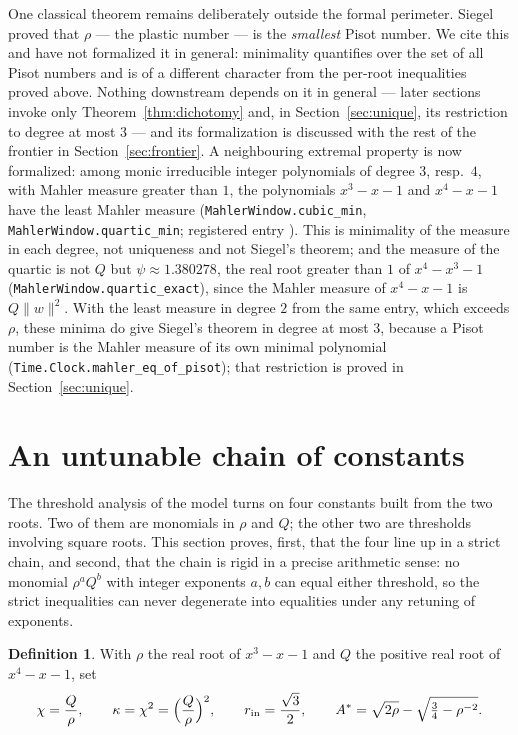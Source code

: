 \documentclass[11pt]{amsart}
\theoremstyle{plain}
\theoremstyle{definition}
\newtheorem{definition}[theorem]{Definition}
\theoremstyle{remark}
\begin{document}
One classical theorem remains deliberately outside the formal perimeter. Siegel \cite{siegel1944} proved that $\rho$ --- the plastic number \cite{aarts2001} --- is the \emph{smallest} Pisot number. We cite this and have not formalized it in general: minimality quantifies over the set of all Pisot numbers and is of a different character from the per-root inequalities proved above. Nothing downstream depends on it in general --- later sections invoke only Theorem~\ref{thm:dichotomy} and, in Section~\ref{sec:unique}, its restriction to degree at most $3$ --- and its formalization is discussed with the rest of the frontier in Section~\ref{sec:frontier}. A neighbouring extremal property is now formalized: among monic irreducible integer polynomials of degree $3$, resp.\ $4$, with Mahler measure greater than $1$, the polynomials $x^3 - x - 1$ and $x^4 - x - 1$ have the least Mahler measure (\texttt{MahlerWindow.cubic\_min}, \texttt{MahlerWindow.quartic\_min}; registered entry \cite{palomar-mahler}). This is minimality of the measure in each degree, not uniqueness and not Siegel's theorem; and the measure of the quartic is not $Q$ but $\psi \approx 1.380278$, the real root greater than $1$ of $x^4 - x^3 - 1$ (\texttt{MahlerWindow.quartic\_exact}), since the Mahler measure of $x^4 - x - 1$ is $Q \lVert w \rVert^2$. With the least measure in degree $2$ from the same entry, which exceeds $\rho$, these minima do give Siegel's theorem in degree at most $3$, because a Pisot number is the Mahler measure of its own minimal polynomial (\texttt{Time.Clock.mahler\_eq\_of\_pisot}); that restriction is proved in Section~\ref{sec:unique}.

\section{An untunable chain of constants}\label{sec:chain}

The threshold analysis of the model turns on four constants built from the two roots. Two of them are monomials in $\rho$ and $Q$; the other two are thresholds involving square roots. This section proves, first, that the four line up in a strict chain, and second, that the chain is rigid in a precise arithmetic sense: no monomial $\rho^a Q^b$ with integer exponents $a, b$ can equal either threshold, so the strict inequalities can never degenerate into equalities under any retuning of exponents.

\begin{definition}\label{def:chain-constants}
With $\rho$ the real root of $x^3 - x - 1$ and $Q$ the positive real root of $x^4 - x - 1$, set
\[
\chi = \frac{Q}{\rho}, \qquad
\kappa = \chi^2 = \Bigl(\frac{Q}{\rho}\Bigr)^{2}, \qquad
r_{\mathrm{in}} = \frac{\sqrt{3}}{2}, \qquad
A^{*} = \sqrt{2\rho} - \sqrt{\tfrac{3}{4} - \rho^{-2}}.
\]
\end{definition}
\end{document}
